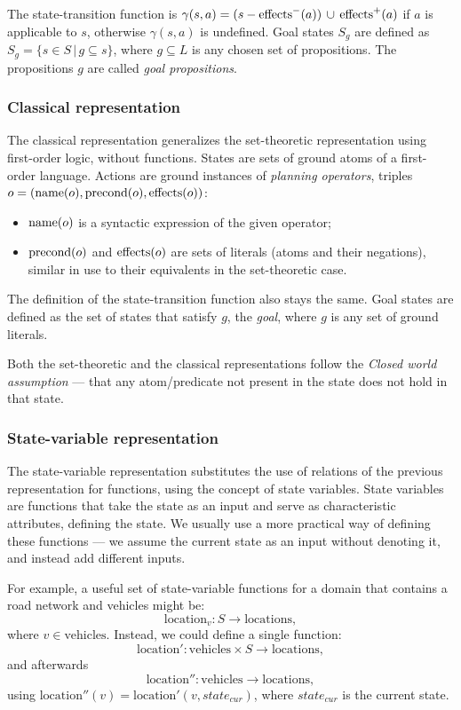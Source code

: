 The state-transition function is $\gamma(s, a) = (s - \operatorname{\textrm{effects}}^-(a)) \,\cup\,
\operatorname{\textrm{effects}}^+(a)$ if $a$ is applicable to $s$,
otherwise $\gamma(s, a)$ is undefined. Goal states $S_g$ are defined as
$S_g = \{s \in S \,|\, g \subseteq s\}$, where
$g \subseteq L$ is any chosen set of propositions. The propositions $g$ are called
\textit{goal propositions}.

\subsubsection{Classical representation}

The classical representation generalizes the set-theoretic representation using first-order logic,
without functions.
States are sets of ground atoms of a first-order language.
Actions are ground instances of \textit{planning operators},
triples $o = (\operatorname{\textrm{name}}(o), \operatorname{\textrm{precond}}(o), \operatorname{\textrm{effects}}(o))$:

\begin{itemize}
\item $\operatorname{\textrm{name}}(o)$ is a syntactic expression of the given operator;
\item $\operatorname{\textrm{precond}}(o)$ and $\operatorname{\textrm{effects}}(o)$ are sets of literals
(atoms and their negations), similar in use to their equivalents
in the set-theoretic case.
\end{itemize}

The definition of the state-transition function also stays the same.
Goal states are defined as the set of states that satisfy $g$,
the \textit{goal}, where $g$ is any set of ground literals.

Both the set-theoretic and the classical representations follow the \textit{Closed world assumption} --- that any atom/predicate not present in the state does not hold in that state.

\subsubsection{State-variable representation}

The state-variable representation substitutes the use of relations of the previous
representation for functions,
using the concept of state variables. State variables are functions
that take the state as an input and serve as characteristic attributes, defining the state. We usually use a more practical way of defining these functions --- we assume
the current state as an input without denoting it, and instead add different inputs.

For example, a useful set of state-variable functions for a domain that contains a road
network and vehicles might be: $$\mathrm{location}_{v}: S \to \mathrm{locations},$$
where $v \in \mathrm{vehicles}$.
Instead, we could define a single function:
$$\mathrm{location'}: \mathrm{vehicles} \times S \to \mathrm{locations},$$
and afterwards 
$$\mathrm{location''}: \mathrm{vehicles} \to \mathrm{locations},$$
using $\mathrm{location''}(v) = \mathrm{location'}(v, state_{cur})$, where $state_{cur}$ is the current state.

